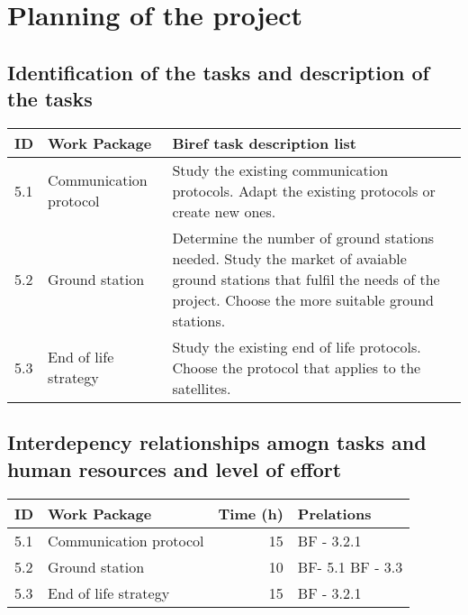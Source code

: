 \documentclass[12pt, titlepage]{article}
\begin{document}
\maketitle

\pagebreak


\section{Planning of the project}


\subsection{Identification of the tasks and description of the tasks}
\begin{tabular}{ | l | p{4cm} | p{8cm} |}
\hline
ID & Work Package & Biref task description list \\ \hline
5.1 & Communication protocol & Study the existing communication protocols. \newline
Adapt the existing protocols or create new ones. \\ \hline
5.2 & Ground station & Determine the number of ground stations needed. \newline
Study the market of avaiable ground stations that fulfil the needs of the project. \newline
Choose the more suitable ground stations. \\ \hline
5.3 & End of life strategy & Study the existing end of life protocols. \newline
Choose the protocol that applies to the satellites. \\
\hline
\end{tabular}


\subsection{Interdepency relationships amogn tasks and human resources and level of effort}
\begin{tabular}{ | l | p{7cm} | r | p{3cm} | }
\hline
ID & Work Package & Time (h) & Prelations \\ \hline
5.1 & Communication protocol & 15 & BF - 3.2.1 \\ \hline
5.2 & Ground station & 10 & BF- 5.1 \newline BF - 3.3 \\ \hline
5.3 & End of life strategy & 15 & BF - 3.2.1 \\
\hline
\end{tabular}
\end{document}
